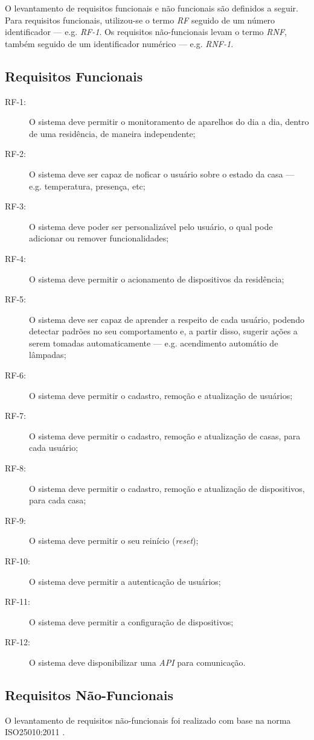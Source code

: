 O levantamento de requisitos funcionais e não funcionais são definidos a seguir. Para requisitos funcionais, utilizou-se o termo \emph{RF} seguido de um número identificador --- e.g. \emph{RF-1}. Os requisitos não-funcionais levam o termo \emph{RNF}, também seguido de um identificador numérico --- e.g. \emph{RNF-1}.

\subsection{Requisitos Funcionais}
\begin{description}
\item[RF-1:] O sistema deve permitir o monitoramento de aparelhos do dia a dia, dentro de uma residência, de maneira independente;
\item[RF-2:] O sistema deve ser capaz de noficar o usuário sobre o estado da casa --- e.g. temperatura, presença, etc;
\item[RF-3:] O sistema deve poder ser personalizável pelo usuário, o qual pode adicionar ou remover funcionalidades;
\item[RF-4:] O sistema deve permitir o acionamento de dispositivos da residência;
\item[RF-5:] O sistema deve ser capaz de aprender a respeito de cada usuário, podendo detectar padrões no seu comportamento e, a partir disso, sugerir ações a serem tomadas automaticamente --- e.g. acendimento automátio de lâmpadas;
\item[RF-6:] O sistema deve permitir o cadastro, remoção e atualização de usuários;
\item[RF-7:] O sistema deve permitir o cadastro, remoção e atualização de casas, para cada usuário;
\item[RF-8:] O sistema deve permitir o cadastro, remoção e atualização de dispositivos, para cada casa;
\item[RF-9:] O sistema deve permitir o seu reinício (\emph{reset});
\item[RF-10:] O sistema deve permitir a autenticação de usuários;
\item[RF-11:] O sistema deve permitir a configuração de dispositivos;
\item[RF-12:] O sistema deve disponibilizar uma \emph{API} para comunicação.

\end{description}

\subsection{Requisitos Não-Funcionais}
O levantamento de requisitos não-funcionais foi realizado com base na norma ISO25010:2011 \cite{iso25010}.

